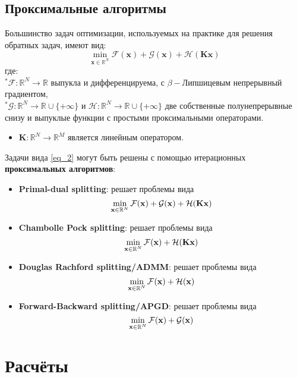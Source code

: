 \documentclass[a4paper,12pt]{article}
\theoremstyle{plain}
\theoremstyle{definition}
\theoremstyle{remark}
\begin{document}
\subsection{Проксимальные алгоритмы}
Большинство задач оптимизации, 
используемых на практике для решения обратных задач, имеют вид:
\begin{equation}
\label{eq_2}
\min_{\textbf{x} \in \mathbb{R}^N}
\mathcal{F}(\textbf{x})
+ \mathcal{G}(\textbf{x})
+ \mathcal{H}(\textbf{Kx})
\end{equation}
где:\\ 
${}^*\mathcal{F}: \mathbb{R}^N \rightarrow \mathbb{R}$
выпукла и дифференцируема, 
с $\beta-$Липшицевым непрерывный градиентом,\\
${}^*\mathcal{G}: 
\mathbb{R}^N \rightarrow \mathbb{R} \cup \{ +\infty \}$
и 
$\mathcal{H}: 
\mathbb{R}^N \rightarrow \mathbb{R} \cup \{ +\infty \}$
две собственные полунепрерывные снизу и 
выпуклые функции с простыми проксимальными операторами.
\begin{itemize}
\item 
$\textbf{K}: 
\mathbb{R}^N \rightarrow \mathbb{R}^M$
является линейным оператором. 
\end{itemize}
Задачи вида \eqref{eq_2} могут быть решены 
с помощью итерационных \textbf{проксимальных алгоритмов}:
\begin{itemize}
\item
\textbf{Primal-dual splitting}:
решает проблемы вида
\[
\min_{\textbf{x}\in \mathbb{R}^N}
\mathcal{F}(\textbf{\textbf{x}}) +
\mathcal{G}(\textbf{\textbf{x}}) +
\mathcal{H}(\textbf{\textbf{Kx}})
\]
\item
\textbf{Chambolle Pock splitting}:
решает проблемы вида
\[
\min_{\textbf{x}\in \mathbb{R}^N}
\mathcal{F}(\textbf{\textbf{x}}) +
\mathcal{H}(\textbf{\textbf{Kx}})
\]
\item
\textbf{Douglas Rachford splitting/ADMM}:
решает проблемы вида
\[
\min_{\textbf{x}\in \mathbb{R}^N}
\mathcal{F}(\textbf{\textbf{x}}) +
\mathcal{H}(\textbf{\textbf{x}})
\]
\item
\textbf{Forward-Backward splitting/APGD}:
решает проблемы вида
\[
\min_{\textbf{x}\in \mathbb{R}^N}
\mathcal{F}(\textbf{\textbf{x}}) +
\mathcal{G}(\textbf{\textbf{x}})
\]
\end{itemize}
\section{Расчёты}
\end{document}

